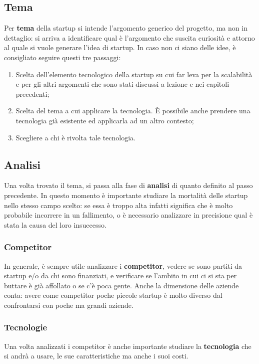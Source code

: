 \subsection{Tema}
Per \textbf{tema} della startup si intende l'argomento generico del progetto,
ma non in dettaglio: si arriva a identificare qual è l'argomento che suscita
curiosità e attorno al quale si vuole generare l'idea di startup. In caso non
ci siano delle idee, è consigliato seguire questi tre passaggi:
\begin{enumerate}
 \item Scelta dell'elemento tecnologico della startup su cui far leva per la
 scalabilità e per gli altri argomenti che sono stati discussi a lezione e nei
 capitoli precedenti;
 \item Scelta del tema a cui applicare la tecnologia. È possibile anche
 prendere una tecnologia già esistente ed applicarla ad un altro contesto;
 \item Scegliere a chi è rivolta tale tecnologia.
\end{enumerate}

\subsection{Analisi}
Una volta trovato il tema, si passa alla fase di \textbf{analisi} di quanto
definito al passo precedente. In questo momento è importante studiare la
mortalità delle startup nello stesso campo scelto: se essa è troppo alta
infatti significa che è molto probabile incorrere in un fallimento, o è
necessario analizzare in precisione qual è stata la causa del loro
insuccesso.

\subsubsection{Competitor}
In generale, è sempre utile analizzare i \textbf{competitor}, vedere se sono
partiti da startup e/o da chi sono finanziati, e verificare se l'ambito in cui
ci si sta per buttare è già affollato o se c'è poca gente. Anche la dimensione
delle aziende conta: avere come competitor poche piccole startup è molto
diverso dal confrontarsi con poche ma grandi aziende.

\subsubsection{Tecnologie}
Una volta analizzati i competitor è anche importante studiare la
\textbf{tecnologia} che si andrà a usare, le sue caratteristiche ma anche i
suoi costi.

